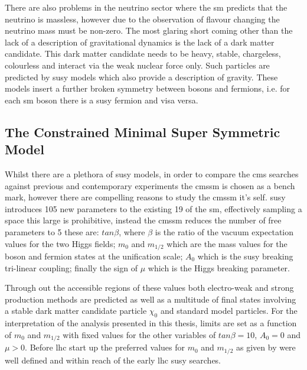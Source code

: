 There are also problems in the neutrino sector where the \ac{sm} predicts that 
the neutrino is massless, however due to the observation of flavour changing 
the neutrino mass must be non-zero.
The most glaring short coming other than the lack of a description of 
gravitational dynamics is the lack of a dark matter candidate. This dark matter 
candidate needs to be heavy, stable, chargeless, colourless and interact via 
the weak nuclear force only. Such particles are predicted by 
\ac{susy}\cite{ref:SUSY-1, ref:SUSY0, ref:SUSY1, ref:SUSY2, ref:SUSY3, 
ref:SUSY4, ref:hierarchy1, ref:hierarchy2} 
models which also provide a description of gravity. These models insert a 
further broken symmetry between bosons and fermions, i.e. for each \ac{sm} 
boson there is a \ac{susy} fermion and visa versa.



\subsection{The Constrained Minimal Super Symmetric Model} %
\label{sec:the_constrained_minimal_super_symmetric_model}
Whilst there are a plethora of \ac{susy} models, in order to compare the 
\ac{cms} searches against previous and contemporary experiments the 
\ac{cmssm}\cite{ref:CMSSM} is chosen as a bench mark, however there are 
compelling reasons to study the \ac{cmssm} it's self. \ac{susy} introduces 105 
new parameters to the existing 19 of the \ac{sm}, effectively sampling a space 
this large is prohibitive, instead the \ac{cmssm} reduces the number of free 
parameters to 5 these are: $tan \beta$, where $\beta$ is the ratio of the 
vacuum expectation values for the two Higgs fields; $m_{0}$ and $m_{1/2}$ which 
are the mass values for the boson and fermion states at the unification scale; 
$A_{0}$ which is the \ac{susy} breaking tri-linear coupling; finally the sign 
of $\mu$ which is the Higgs breaking parameter.

Through out the accessible regions of these values both electro-weak and strong 
production methods are predicted as well as a multitude of final states 
involving a stable dark matter candidate particle $\chi_{0}$ and standard model 
particles. For the interpretation of the analysis presented in this thesis, 
limits are set as a function of $m_{0}$ and $m_{1/2}$ with fixed values for the 
other variables of $tan \beta = 10$, $A_{0} = 0$ and $\mu > 0$.
Before \ac{lhc} start up the preferred values for $m_{0}$ and $m_{1/2}$ as 
given by \cite{Buchmueller:2011tr} were well defined and within reach of the 
early \ac{lhc} \ac{susy} searches.

